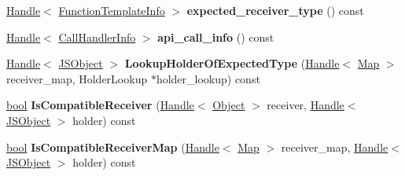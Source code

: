 \begin{DoxyCompactItemize}
\item 
\mbox{\label{classv8_1_1internal_1_1CallOptimization_accb66e478287562a24215befdd051abb}} 
\mbox{\hyperlink{classv8_1_1internal_1_1Handle}{Handle}}$<$ \mbox{\hyperlink{classv8_1_1internal_1_1FunctionTemplateInfo}{Function\+Template\+Info}} $>$ {\bfseries expected\+\_\+receiver\+\_\+type} () const
\item 
\mbox{\label{classv8_1_1internal_1_1CallOptimization_ac8922d4130b7a05d12ada87cb8d438d9}} 
\mbox{\hyperlink{classv8_1_1internal_1_1Handle}{Handle}}$<$ \mbox{\hyperlink{classv8_1_1internal_1_1CallHandlerInfo}{Call\+Handler\+Info}} $>$ {\bfseries api\+\_\+call\+\_\+info} () const
\item 
\mbox{\label{classv8_1_1internal_1_1CallOptimization_a4bb64022038aefd62d836cc48e02850b}} 
\mbox{\hyperlink{classv8_1_1internal_1_1Handle}{Handle}}$<$ \mbox{\hyperlink{classv8_1_1internal_1_1JSObject}{J\+S\+Object}} $>$ {\bfseries Lookup\+Holder\+Of\+Expected\+Type} (\mbox{\hyperlink{classv8_1_1internal_1_1Handle}{Handle}}$<$ \mbox{\hyperlink{classv8_1_1internal_1_1Map}{Map}} $>$ receiver\+\_\+map, Holder\+Lookup $\ast$holder\+\_\+lookup) const
\item 
\mbox{\label{classv8_1_1internal_1_1CallOptimization_a1b9265b52b11bf07e8a0ad46da757fc6}} 
\mbox{\hyperlink{classbool}{bool}} {\bfseries Is\+Compatible\+Receiver} (\mbox{\hyperlink{classv8_1_1internal_1_1Handle}{Handle}}$<$ \mbox{\hyperlink{classv8_1_1internal_1_1Object}{Object}} $>$ receiver, \mbox{\hyperlink{classv8_1_1internal_1_1Handle}{Handle}}$<$ \mbox{\hyperlink{classv8_1_1internal_1_1JSObject}{J\+S\+Object}} $>$ holder) const
\item 
\mbox{\label{classv8_1_1internal_1_1CallOptimization_aa60df6df8709243709fc1075256afc88}} 
\mbox{\hyperlink{classbool}{bool}} {\bfseries Is\+Compatible\+Receiver\+Map} (\mbox{\hyperlink{classv8_1_1internal_1_1Handle}{Handle}}$<$ \mbox{\hyperlink{classv8_1_1internal_1_1Map}{Map}} $>$ receiver\+\_\+map, \mbox{\hyperlink{classv8_1_1internal_1_1Handle}{Handle}}$<$ \mbox{\hyperlink{classv8_1_1internal_1_1JSObject}{J\+S\+Object}} $>$ holder) const
\end{DoxyCompactItemize}


